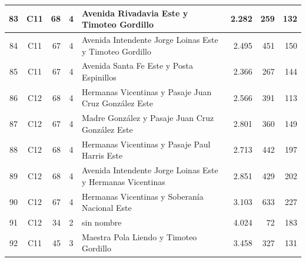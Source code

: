 \begin{longtable}{|c|c|r|c|p{4.2cm}|r|r|r|}
83 & C11 & 68 & 4 & Avenida Rivadavia Este y Timoteo Gordillo & 2.282 & 259 & 132 \\ \hline
84 & C11 & 67 & 4 & Avenida Intendente Jorge Loinas Este y Timoteo Gordillo & 2.495 & 451 & 150 \\ \hline
85 & C11 & 67 & 4 & Avenida Santa Fe Este y Posta Espinillos & 2.366 & 267 & 144 \\ \hline
86 & C12 & 68 & 4 & Hermanas Vicentinas y Pasaje Juan Cruz González Este & 2.566 & 391 & 113 \\ \hline
87 & C12 & 67 & 4 & Madre González y Pasaje Juan Cruz González Este & 2.801 & 360 & 149 \\ \hline
88 & C12 & 68 & 4 & Hermanas Vicentinas y Pasaje Paul Harris Este & 2.713 & 442 & 197 \\ \hline
89 & C12 & 68 & 4 & Avenida Intendente Jorge Loinas Este y Hermanas Vicentinas & 2.851 & 429 & 202 \\ \hline
90 & C12 & 67 & 4 & Hermanas Vicentinas y Soberanía Nacional Este & 3.103 & 633 & 227 \\ \hline
91 & C12 & 34 & 2 & sin nombre & 4.024 & 72 & 183 \\ \hline
92 & C11 & 45 & 3 & Maestra Pola Liendo y Timoteo Gordillo & 3.458 & 327 & 131 \\ \hline
\end{longtable}
